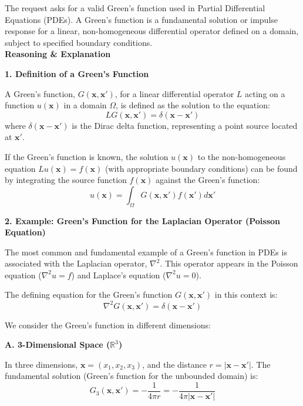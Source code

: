 \documentclass[12pt,a4paper]{report}
\begin{document}
{The request asks for a valid Green's function used in Partial Differential Equations (PDEs). A Green's function is a fundamental solution or impulse response for a linear, non-homogeneous differential operator defined on a domain, subject to specified boundary conditions.\\

\textbf{ Reasoning \& Explanation}

\begin{description}

\item \textbf{1. Definition of a Green's Function}

A Green's function, $G(\mathbf{x}, \mathbf{x}')$, for a linear differential operator $L$ acting on a function $u(\mathbf{x})$ in a domain $\Omega$, is defined as the solution to the equation:
$$L G(\mathbf{x}, \mathbf{x}') = \delta(\mathbf{x} - \mathbf{x}')$$
where $\delta(\mathbf{x} - \mathbf{x}')$ is the Dirac delta function, representing a point source located at $\mathbf{x}'$.

If the Green's function is known, the solution $u(\mathbf{x})$ to the non-homogeneous equation $L u(\mathbf{x}) = f(\mathbf{x})$ (with appropriate boundary conditions) can be found by integrating the source function $f(\mathbf{x})$ against the Green's function:
$$u(\mathbf{x}) = \int_{\Omega} G(\mathbf{x}, \mathbf{x}') f(\mathbf{x}') d\mathbf{x}'$$

\item \textbf{2. Example: Green's Function for the Laplacian Operator (Poisson Equation)}

The most common and fundamental example of a Green's function in PDEs is associated with the Laplacian operator, $\nabla^2$. This operator appears in the Poisson equation ($\nabla^2 u = f$) and Laplace's equation ($\nabla^2 u = 0$).

The defining equation for the Green's function $G(\mathbf{x}, \mathbf{x}')$ in this context is:
$$\nabla^2 G(\mathbf{x}, \mathbf{x}') = \delta(\mathbf{x} - \mathbf{x}')$$

We consider the Green's function in different dimensions:

\begin{description}

\item  \textbf{A. 3-Dimensional Space ($\mathbb{R}^3$)}

In three dimensions, $\mathbf{x} = (x_1, x_2, x_3)$, and the distance $r = |\mathbf{x} - \mathbf{x}'|$. The fundamental solution (Green's function for the unbounded domain) is:
$$G_3(\mathbf{x}, \mathbf{x}') = -\frac{1}{4\pi r} = -\frac{1}{4\pi |\mathbf{x} - \mathbf{x}'|}$$


\end{description}
\end{description}}
\end{document}
